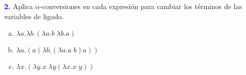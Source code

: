 \textbf{\textcolor{blue}{2.}} \Large
Aplica $\alpha$-conversiones en cada expresión
para cambiar los términos de las variables de ligado.
\begin{enumerate}[a)]
    \item $\lambda a.\lambda b.(\lambda a.b \; \lambda b.a)$
    \item $\lambda a.(a(\lambda b.(\lambda a.a\; b)a))$
    \item $\lambda x.(\lambda y.x\; \lambda y(\lambda x.x \; y))$
\end{enumerate}
